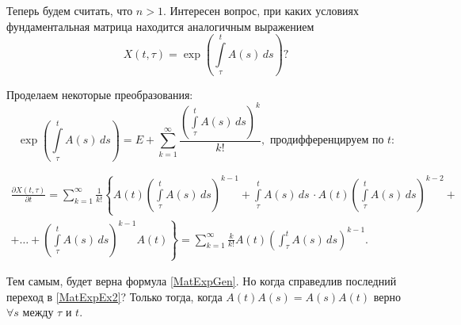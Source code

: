 Теперь будем считать, что $n > 1$.
Интересен вопрос,
при каких условиях фундаментальная матрица
находится аналогичным выражением
\begin{equation}
\label{MatExpGen}
  X(t, \tau) = \exp\left(\int\limits_{\tau}^{t} A(s)\,ds\right)?
\end{equation}

Проделаем некоторые преобразования:
\begin{equation*}
  \exp\left(\int\limits_{\tau}^{t} A(s)\,ds\right) = 
  E +
  \sum\limits_{k = 1}^{\infty}
    \frac{\left(\int\limits_{\tau}^{t} A(s)\,ds\right)^{k}}{k!},
    \text{ продифференцируем по $t$:}
\end{equation*}

\begin{multline}
  \frac{\partial X(t, \tau)}{\partial t} =
  \sum\limits_{k = 1}^{\infty} \frac{1}{k!}
  \left\{
	  A(t){\left(
 		       \int\limits_{\tau}^{t}A(s)\,ds
 	       \right)}^{k-1} +
 	  \int\limits_{\tau}^{t}A(s)\,ds\,\cdot
 	  A(t){\left(
		       \int\limits_{\tau}^{t}A(s)\,ds
	       \right)}^{k - 2} +\right.\\
	\label{MatExpEx2}
	\left.
	  +\ldots +
	  \left(
		  \int\limits_{\tau}^{t}A(s)\,ds
	  \right)^{k - 1}A(t)
  \right\} =
  \sum\limits_{k = 1}^{\infty}
    \frac{k}{k!} A(t)\left(
                           \int_{\tau}^{t}A(s)\,ds 
                     \right)^{k - 1}.
\end{multline}

Тем самым, будет верна формула \eqref{MatExpGen}.
Но когда справедлив последний
переход в \eqref{MatExpEx2}?
Только тогда, когда $A(t)A(s) = A(s)A(t)$
верно $\forall s$ между $\tau$ и $t$.
